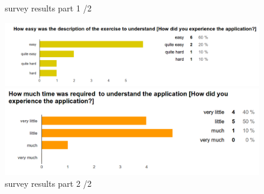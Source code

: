 \begin{figure}[b!]
\begin{minipage}{0.7\textwidth}
    \end{minipage}
  \caption{survey results part 1 /2 }
  \label{fig:survey1}
\end{figure}

\begin{figure}[b!]
  \centering
    \begin{minipage}{0.7\textwidth}
      \centering
        \includegraphics[width=1\textwidth]{00_resources/figures/survey_results4.png}
    \end{minipage}
    \begin{minipage}{0.7\textwidth}
      \centering
        \includegraphics[width=1\textwidth]{00_resources/figures/survey_results5.png}
    \end{minipage}
  \caption{survey results part 2 /2 }
  \label{fig:survey2}
\end{figure}
